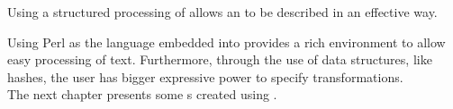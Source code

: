 Using a structured processing of \abc{} allows an \abcpt{} to be described in an effective way.

Using Perl as the language embedded into \abcdt{} provides a rich environment to allow easy
processing of text. Furthermore, through the use of data structures, like hashes, the user has
bigger expressive power to specify transformations.\\

The next chapter presents some \abcpt{}s created using \abcdt{}.
